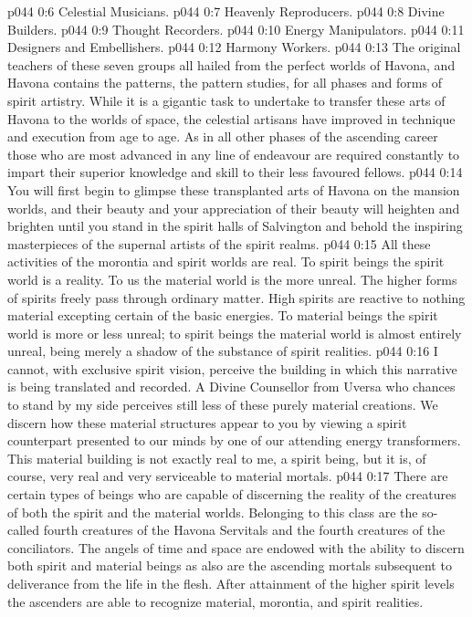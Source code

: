 \vs p044 0:6 \bibnobreakspace Celestial Musicians.
\vs p044 0:7 \bibnobreakspace Heavenly Reproducers.
\vs p044 0:8 \bibnobreakspace Divine Builders.
\vs p044 0:9 \bibnobreakspace Thought Recorders.
\vs p044 0:10 \bibnobreakspace Energy Manipulators.
\vs p044 0:11 \bibnobreakspace Designers and Embellishers.
\vs p044 0:12 \bibnobreakspace Harmony Workers.
\vs p044 0:13 \pc The original teachers of these seven groups all hailed from the perfect worlds of Havona, and Havona contains the patterns, the pattern studies, for all phases and forms of spirit artistry. While it is a gigantic task to undertake to transfer these arts of Havona to the worlds of space, the celestial artisans have improved in technique and execution from age to age. As in all other phases of the ascending career those who are most advanced in any line of endeavour are required constantly to impart their superior knowledge and skill to their less favoured fellows.
\vs p044 0:14 You will first begin to glimpse these transplanted arts of Havona on the mansion worlds, and their beauty and your appreciation of their beauty will heighten and brighten until you stand in the spirit halls of Salvington and behold the inspiring masterpieces of the supernal artists of the spirit realms.
\vs p044 0:15 \pc All these activities of the morontia and spirit worlds are real. To spirit beings the spirit world is a reality. To us the material world is the more unreal. The higher forms of spirits freely pass through ordinary matter. High spirits are reactive to nothing material excepting certain of the basic energies. To material beings the spirit world is more or less unreal; to spirit beings the material world is almost entirely unreal, being merely a shadow of the substance of spirit realities.
\vs p044 0:16 I cannot, with exclusive spirit vision, perceive the building in which this narrative is being translated and recorded. A Divine Counsellor from Uversa who chances to stand by my side perceives still less of these purely material creations. We discern how these material structures appear to you by viewing a spirit counterpart presented to our minds by one of our attending energy transformers. This material building is not exactly real to me, a spirit being, but it is, of course, very real and very serviceable to material mortals.
\vs p044 0:17 There are certain types of beings who are capable of discerning the reality of the creatures of both the spirit and the material worlds. Belonging to this class are the so\hyp{}called fourth creatures of the Havona Servitals and the fourth creatures of the conciliators. The angels of time and space are endowed with the ability to discern both spirit and material beings as also are the ascending mortals subsequent to deliverance from the life in the flesh. After attainment of the higher spirit levels the ascenders are able to recognize material, morontia, and spirit realities.
